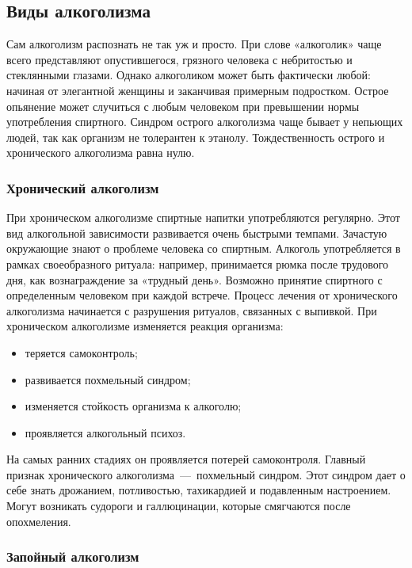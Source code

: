 \documentclass[14pt]{extarticle}
\begin{document}
\subsection{Виды алкоголизма}

Сам алкоголизм распознать не так уж и просто. При слове «алкоголик» чаще всего представляют опустившегося, грязного человека с небритостью и стеклянными глазами. Однако алкоголиком может быть фактически любой: начиная от элегантной женщины и заканчивая примерным подростком. Острое опьянение может случиться с любым человеком при превышении нормы употребления спиртного. Синдром острого алкоголизма чаще бывает у непьющих людей, так как организм не толерантен к этанолу. Тождественность острого и хронического алкоголизма равна нулю.

\subsubsection*{Хронический алкоголизм}

При хроническом алкоголизме спиртные напитки употребляются регулярно. Этот вид алкогольной зависимости развивается очень быстрыми темпами. Зачастую окружающие знают о проблеме человека со спиртным. Алкоголь употребляется в рамках своеобразного ритуала: например, принимается рюмка после трудового дня, как вознаграждение за «трудный день». Возможно принятие спиртного с определенным человеком при каждой встрече. Процесс лечения от хронического алкоголизма начинается с разрушения ритуалов, связанных с выпивкой. При хроническом алкоголизме изменяется реакция организма:

\begin{itemize}
	\item теряется самоконтроль;
	\item развивается похмельный синдром;
	\item изменяется стойкость организма к алкоголю;
	\item проявляется алкогольный психоз.
\end{itemize}
	
На самых ранних стадиях он проявляется потерей самоконтроля. Главный признак хронического алкоголизма~---~похмельный синдром. Этот синдром дает о себе знать дрожанием, потливостью, тахикардией и подавленным настроением. Могут возникать судороги и галлюцинации, которые смягчаются после опохмеления.

\subsubsection*{Запойный алкоголизм}
\end{document}
